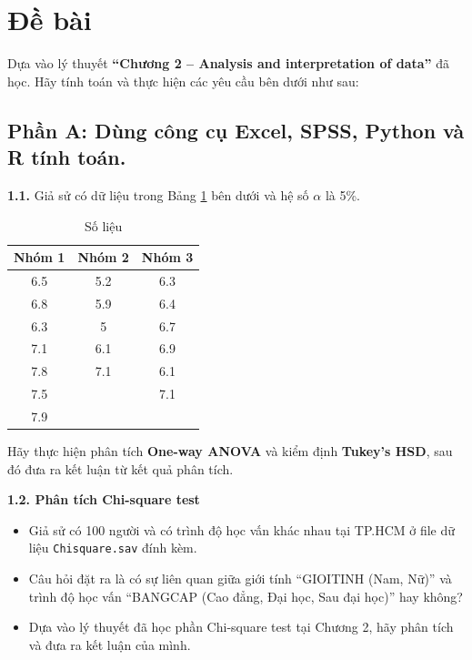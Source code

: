 \newpage
\section*{Đề bài}

\par
Dựa vào lý thuyết \textbf{``Chương 2 -- Analysis and interpretation of data''} đã học.
Hãy tính toán và thực hiện các yêu cầu bên dưới như sau:



\subsection*{Phần A: Dùng công cụ Excel, SPSS, Python và R tính toán.}

\textbf{1.1.} Giả sử có dữ liệu trong Bảng \ref{tab:cau1a} bên dưới và hệ số $\alpha$ là 5\%.

\begin{center}
\begin{table}[!htp]
\centering
\begin{tabular}{|c|c|c|}
\hline
\textbf{Nhóm 1} & \textbf{Nhóm 2} & \textbf{Nhóm 3} \\
\hline
6.5 & 5.2 & 6.3 \\
6.8 & 5.9 & 6.4 \\
6.3 & 5   & 6.7 \\
7.1 & 6.1 & 6.9 \\
7.8 & 7.1 & 6.1 \\
7.5 &     & 7.1 \\
7.9 &     &     \\
\hline
\end{tabular}
\caption{Số liệu}
\label{tab:cau1a}
\end{table}
\end{center}

Hãy thực hiện phân tích \textbf{One-way ANOVA} và kiểm định \textbf{Tukey’s HSD}, sau đó đưa ra kết luận từ kết quả phân tích.

\textbf{1.2. Phân tích Chi-square test}

\begin{itemize}
\item Giả sử có 100 người và có trình độ học vấn khác nhau tại TP.HCM ở file dữ liệu \texttt{Chisquare.sav} đính kèm.
\item Câu hỏi đặt ra là có sự liên quan giữa giới tính ``GIOITINH (Nam, Nữ)'' và trình độ học vấn 
``BANGCAP (Cao đẳng, Đại học, Sau đại học)'' hay không?
\item Dựa vào lý thuyết đã học phần Chi-square test tại Chương 2, hãy phân tích và đưa ra kết luận của mình.
\end{itemize}


